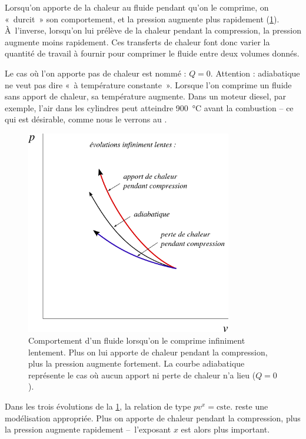 		Lorsqu’on apporte de la chaleur au fluide pendant qu’on le comprime, on «~durcit~» son comportement, et la pression augmente plus rapidement (\cref{fig_p-v_ajout_retrait_chaleur}). À~l’inverse, lorsqu’on lui prélève de la chaleur pendant la compression, la pression augmente moins rapidement. Ces transferts de chaleur font donc varier la quantité de travail à fournir pour comprimer le fluide entre deux volumes donnés.
		
		Le cas où l’on apporte pas de chaleur est nommé  : $Q = 0$. Attention : adiabatique ne veut pas dire «~à température constante~». Lorsque l’on comprime un fluide sans apport de chaleur, sa température augmente. Dans un moteur diesel, par exemple, l’air dans les cylindres peut atteindre \SI{900}{\degreeCelsius} avant la combustion -- ce qui est désirable, comme nous le verrons au \courssept.

		\begin{figure}
			\begin{center}
			\includegraphics[width=9cm]{images/pv_transfert_chaleur.png}
			\end{center}
			\caption{Comportement d’un fluide lorsqu’on le comprime infiniment lentement.
Plus on lui apporte de chaleur pendant la compression, plus la pression augmente fortement. La courbe adiabatique représente le cas où aucun apport ni perte de chaleur n’a lieu ($Q = 0$).}
			\label{fig_p-v_ajout_retrait_chaleur}
		\end{figure}


		Dans les trois évolutions de la \cref{fig_p-v_ajout_retrait_chaleur}, la relation de type $p v^{x} = \text{cste.}$ reste une modélisation appropriée. Plus on apporte de chaleur pendant la compression, plus la pression augmente rapidement --\ l’exposant $x$ est alors plus important.

